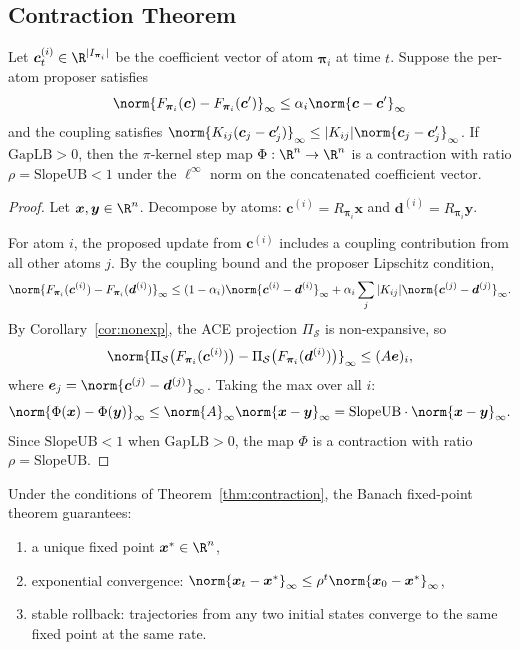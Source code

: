 \documentclass[11pt]{article}
\begin{document}
\subsection{Contraction Theorem}

\begin{theorem}
\label{thm:contraction}
Let $\bm{c}^{(i)}_t\in\R^{|I_{\bm{\pi}_i}|}$ be the coefficient vector of
atom $\bm{\pi}_i$ at time $t$.  Suppose the per-atom proposer satisfies
\[
  \norm{F_{\bm{\pi}_i}(\bm{c}) - F_{\bm{\pi}_i}(\bm{c}')}_\infty
  \leq \alpha_i \norm{\bm{c}-\bm{c}'}_\infty
\]
and the coupling satisfies
$\norm{K_{ij}(\bm{c}_j-\bm{c}_j')}_\infty \leq |K_{ij}|\norm{\bm{c}_j-\bm{c}_j'}_\infty$.
If $\mathrm{GapLB} > 0$, then the $\pi$-kernel step map
$\Phi:\R^n\to\R^n$ is a contraction with ratio $\rho = \mathrm{SlopeUB} < 1$
under the $\ell^\infty$ norm on the concatenated coefficient vector.
\end{theorem}

\begin{proof}
Let $\bm{x},\bm{y}\in\R^n$.  Decompose by atoms:
$\bm{c}^{(i)} = R_{\bm{\pi}_i}\bm{x}$ and
$\bm{d}^{(i)} = R_{\bm{\pi}_i}\bm{y}$.

For atom $i$, the proposed update from $\bm{c}^{(i)}$ includes a coupling
contribution from all other atoms $j$.  By the coupling bound and the
proposer Lipschitz condition,
\[
  \norm{F_{\bm{\pi}_i}(\bm{c}^{(i)}) - F_{\bm{\pi}_i}(\bm{d}^{(i)})}_\infty
  \leq (1-\alpha_i)\norm{\bm{c}^{(i)}-\bm{d}^{(i)}}_\infty
       + \alpha_i \sum_j |K_{ij}|\norm{\bm{c}^{(j)}-\bm{d}^{(j)}}_\infty.
\]
By Corollary~\ref{cor:nonexp}, the ACE projection $\Pi_{\mathcal{S}}$ is
non-expansive, so
\[
  \norm{\Pi_{\mathcal{S}}\bigl(F_{\bm{\pi}_i}(\bm{c}^{(i)})\bigr)
        - \Pi_{\mathcal{S}}\bigl(F_{\bm{\pi}_i}(\bm{d}^{(i)})\bigr)}_\infty
  \leq (A\bm{e})_i,
\]
where $\bm{e}_j = \norm{\bm{c}^{(j)}-\bm{d}^{(j)}}_\infty$.  Taking the
max over all $i$:
\[
  \norm{\Phi(\bm{x})-\Phi(\bm{y})}_\infty
  \leq \norm{A}_\infty \norm{\bm{x}-\bm{y}}_\infty
  = \mathrm{SlopeUB}\cdot\norm{\bm{x}-\bm{y}}_\infty.
\]
Since $\mathrm{SlopeUB} < 1$ when $\mathrm{GapLB}>0$, the map $\Phi$ is a
contraction with ratio $\rho = \mathrm{SlopeUB}$.
\end{proof}

\begin{corollary}
\label{cor:fixedpoint}
Under the conditions of Theorem~\ref{thm:contraction}, the Banach fixed-point
theorem guarantees:
\begin{enumerate}[label=(\roman*)]
  \item a unique fixed point $\bm{x}^*\in\R^n$,
  \item exponential convergence: $\norm{\bm{x}_t - \bm{x}^*}_\infty \leq \rho^t\norm{\bm{x}_0-\bm{x}^*}_\infty$,
  \item stable rollback: trajectories from any two initial states converge to the same fixed point at the same rate.
\end{enumerate}
\end{corollary}
\end{document}
